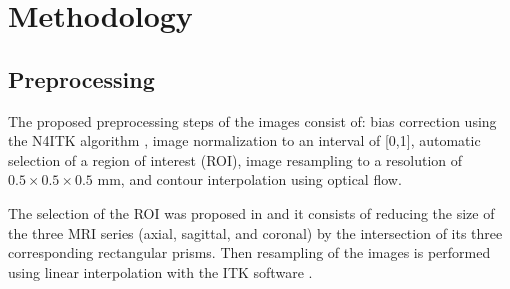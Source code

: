 \section{Methodology}
\label{sec:methods}



\subsection{Preprocessing}
\label{subsec:prepro}
The proposed preprocessing steps of the images consist of: 
bias correction using the N4ITK algorithm \cite{n4itk}, 
image normalization to an interval of [0,1],
automatic selection of a region of interest (ROI), 
image resampling to a resolution of $0.5 \times 0.5 \times 0.5$ mm, 
and contour interpolation using optical flow.


The selection of the ROI was proposed in \cite{anneke} and it 
consists of reducing the size of the three MRI series (axial, sagittal, and coronal)
by the intersection of its three corresponding rectangular prisms. Then resampling
of the images is performed using linear interpolation with the ITK software \cite{itk}. 

